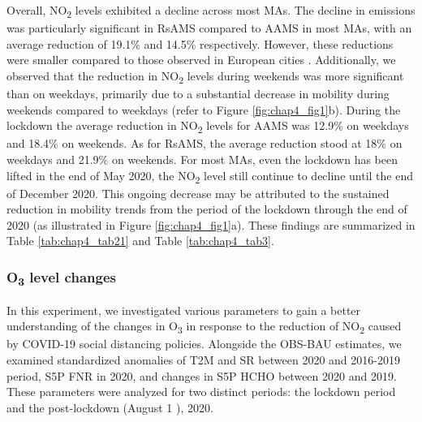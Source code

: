 Overall, NO\textsubscript{2} levels exhibited a decline across most MAs. The decline in emissions was particularly significant in RsAMS compared to AAMS in most MAs, with an average reduction of 19.1\% and 14.5\% respectively. However, these reductions were smaller compared to those observed in European cities \citep{barre2021estimating,grange2021covid}. Additionally, we observed that the reduction in NO\textsubscript{2} levels during weekends was more significant than on weekdays, primarily due to a substantial decrease in mobility during weekends compared to weekdays (refer to Figure \ref{fig:chap4_fig1}b). During the lockdown the average reduction in NO\textsubscript{2} levels for AAMS was 12.9\% on weekdays and 18.4\% on weekends. As for RsAMS, the average reduction stood at 18\% on weekdays and 21.9\% on weekends. For most MAs, even the lockdown has been lifted in the end of May 2020, the NO\textsubscript{2} level still continue to decline until the end of December 2020. This ongoing decrease may be attributed to the sustained reduction in mobility trends from the period of the lockdown through the end of 2020 (as illustrated in Figure \ref{fig:chap4_fig1}a). These findings are summarized in Table \ref{tab:chap4_tab21} and Table \ref{tab:chap4_tab3}. \par

\subsubsection{O\textsubscript{3} level changes}
In this experiment, we investigated various parameters to gain a better understanding of the changes in O\textsubscript{3} in response to the reduction of NO\textsubscript{2} caused by COVID-19 social distancing policies. Alongside the OBS-BAU estimates, we examined standardized anomalies of T2M and SR between 2020 and 2016-2019 period, S5P FNR in 2020, and changes in S5P HCHO between 2020 and 2019. These parameters were analyzed for two distinct periods: the lockdown period and the post-lockdown (August 1 ), 2020. \par

